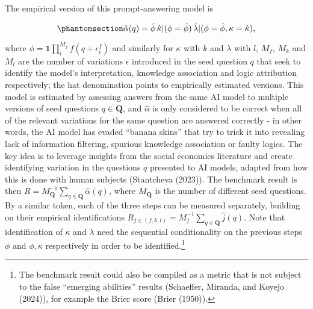 \documentclass[
]{article}
\begin{document}
The empirical version of this prompt-answering model is

\begin{equation}\phantomsection\label{eq-empiric}{\hat{\alpha}(q) = \hat{\phi} \, \hat{\kappa}|(\phi=\hat{\phi}) \, \hat{\lambda}|(\phi=\hat{\phi}, \kappa=\hat{\kappa}),
}\end{equation}

where \(\phi = \mathbf{1} \prod_{i}^{M_f} f(q + \epsilon_i^f)\) and
similarly for \(\kappa\) with \(k\) and \(\lambda\) with \(l\), \(M_f\),
\(M_k\) and \(M_l\) are the number of variations \(\epsilon\) introduced
in the seed question \(q\) that seek to identify the model's
interpretation, knowledge association and logic attribution
respectively; the hat denomination points to empirically estimated
versions. This model is estimated by assessing answers from the same AI
model to multiple versions of seed questions \(q \in \mathbf{Q}\), and
\(\hat{\alpha}\) is only considered to be correct when all of the
relevant variations for the same question are answered correctly - in
other words, the AI model has evaded ``banana skins'' that try to trick
it into revealing lack of information filtering, spurious knowledge
association or faulty logics. The key idea is to leverage insights from
the social economics literature and create identifying variation in the
questions \(q\) presented to AI models, adapted from how this is done
with human subjects (Stantcheva (2023)). The benchmark result is then
\(R = M_{\mathbf{Q}}^{-1}\sum_{q \in \mathbf{Q}} \hat{\alpha}(q)\),
where \(M_{\mathbf{Q}}\) is the number of different seed questions. By a
similar token, each of the three steps can be measured separately,
building on their empirical identifications
\(R_{j \in (f, k, l)} = M_{j}^{-1}\sum_{q \in \mathbf{Q}} \hat{j}(q)\).
Note that identification of \(\kappa\) and \(\lambda\) need the
sequential conditionality on the previous steps \(\phi\) and
\(\phi, \kappa\) respectively in order to be identified.\footnote{The
  benchmark result could also be compiled as a metric that is not
  subject to the false ``emerging abilities'' results (Schaeffer,
  Miranda, and Koyejo (2024)), for example the Brier score (Brier
  (1950)).}
\end{document}
